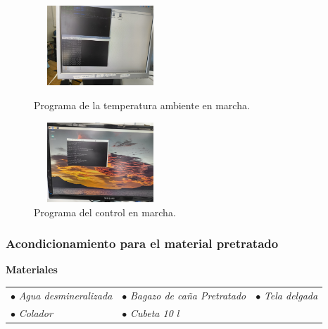 \documentclass[12pt]{article}
\begin{document}
			\begin{figure}[H]
				\centering
				\begin{minipage}{0.46\textwidth}
					\centering
					\includegraphics[width=5cm, height=3cm]{imagenes/programa1} %
					\caption{Programa de la temperatura ambiente en marcha.}
					\label{progra 1}
				\end{minipage}
				\hfill
				\begin{minipage}{0.48\textwidth}
					\centering
					\includegraphics[width=5cm, height=3cm]{imagenes/programa2} %
					\caption{Programa del control en marcha.}
					\label{progra 2}
				\end{minipage}
			\end{figure}
			

			
			
			
			
			
			\subsubsection{Acondicionamiento para el material pretratado}
			
			 \textbf{Materiales}
			\\[0.5em]
		
			\begin{tabular}{p{0.3\textwidth}p{}p{}}
				$\bullet$ \textit{Agua desmineralizada} & $\bullet$ \textit{ Bagazo de caña Pretratado} & $\bullet$ \textit{Tela delgada}  \\
			
				$\bullet$ \textit{Colador} & $\bullet$ \textit{Cubeta 10 l} & 
			\end{tabular}
			\\[0.5em]
			
\end{document}
